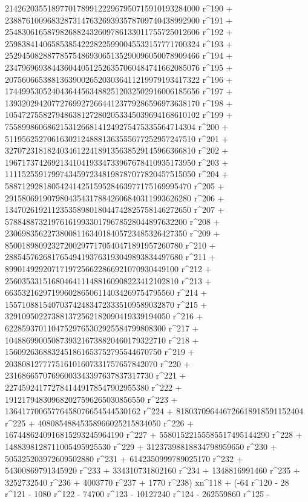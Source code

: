        2142620355189770178991222967950715910193284000 r^190 + 
       2388761009683287314763269393578709740438992900 r^191 + 
       2548306165879826882432609786133011755725012606 r^192 + 
       2598384140658538542228225990045532157771700324 r^193 + 
       2529450828877857548693065135290096050078909466 r^194 + 
       2347969693844360440512526357060484741662085076 r^195 + 
       2075606653881363900265203036411219979193417322 r^196 + 
       1744995305240436445634882512032502916006185656 r^197 + 
       1393202942077276992726644123779286596973638170 r^198 + 
       1054727558279486381272802053345039694168610102 r^199 + 
       755899860686215312668141249275475335564714304 r^200 + 
       511956252706163021248881363555677252957247510 r^201 + 
       327072318182403461224189135638529145966366810 r^202 + 
       196717374269213410419334733967678410935173950 r^203 + 
       111152559179974345972348198787077820457515050 r^204 + 
       58871292818054241425159528463977175169995470 r^205 + 
       29158069190798043543178842606840311993626280 r^206 + 
       13470261921123535898018044742825758146272650 r^207 + 
       5788488732197616199330179678528044897632200 r^208 + 
       2306983562273800811634018405723485326427350 r^209 + 
       850018980923272002977170540471891957260780 r^210 + 
       288545762681765494193763193049893834497680 r^211 + 
       89901492920717197256622866921070930449100 r^212 + 
       25603533151680464111488160908223412102810 r^213 + 
       6635321629719960286506114034269754795560 r^214 + 
       1557108815407037424834723335109589032870 r^215 + 
       329109502273881372562182090419339194050 r^216 + 
       62285937011047529765302925584799808300 r^217 + 
       10488699005087393216738820460179322710 r^218 + 
       1560926368832451861653752795544670750 r^219 + 
       203808127777516101607331757657842070 r^220 + 
       23168665707696003343397637837317730 r^221 + 
       2274592417727841449178547902955380 r^222 + 
       191217948309682027596265030856550 r^223 + 
       13641770065776458076654544530162 r^224 + 
       818037096446726618918591152404 r^225 + 
       40808548845358966025215834050 r^226 + 
       1674486240916815293245964190 r^227 + 
       55801522155585517495144290 r^228 + 
       1488398128711005495925530 r^229 + 
       31237398818834798959650 r^230 + 505325203972609502880 r^231 + 
       6142350999789025170 r^232 + 54300869791345920 r^233 + 
       334310731802160 r^234 + 1348816991460 r^235 + 
       3252732540 r^236 + 4003770 r^237 + 
       1770 r^238) xn^118 + (-64 r^120 - 28 r^121 - 1080 r^122 - 
       74700 r^123 - 10127240 r^124 - 262559860 r^125 - 
